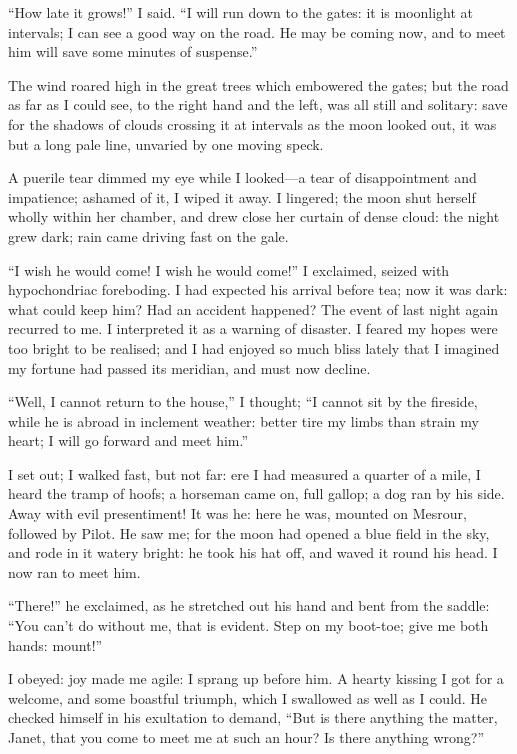 \enquote{How late it grows!} I said.  \enquote{I will run down to the
gates: it is moonlight at intervals; I can see a good way on the road. 
He may be coming now, and to meet him will save some minutes of
suspense.}

The wind roared high in the great trees which embowered the gates; but
the road as far as I could see, to the right hand and the left, was all
still and solitary: save for the shadows of clouds crossing it at
intervals as the moon looked out, it was but a long pale line, unvaried
by one moving speck.

A puerile tear dimmed my eye while I looked---a tear of disappointment
and impatience; ashamed of it, I wiped it away.  I lingered; the moon
shut herself wholly within her chamber, and drew close her curtain of
dense cloud: the night grew dark; rain came driving fast on the gale.

\enquote{I wish he would come!  I wish he would come!} I exclaimed,
seized with hypochondriac foreboding.  I had expected his arrival before
tea; now it was dark: what could keep him?  Had an accident happened? 
The event of last night again recurred to me.  I interpreted it as a
warning of disaster.  I feared my hopes were too bright to be realised;
and I had enjoyed so much bliss lately that I imagined my fortune had
passed its meridian, and must now decline.

\enquote{Well, I cannot return to the house,} I thought; \enquote{I
cannot sit by the fireside, while he is abroad in inclement weather:
better tire my limbs than strain my heart; I will go forward and meet
him.}

I set out; I walked fast, but not far: ere I had measured a quarter of a
mile, I heard the tramp of hoofs; a horseman came on, full gallop; a dog
ran by his side.  Away with evil presentiment!  It was he: here he was,
mounted on Mesrour, followed by Pilot.  He saw me; for the moon had
opened a blue field in the sky, and rode in it watery bright: he took
his hat off, and waved it round his head.  I now ran to meet him.

\enquote{There!} he exclaimed, as he stretched out his hand and bent
from the saddle: \enquote{You can't do without me, that is evident. 
Step on my boot-toe; give me both hands: mount!}

I obeyed: joy made me agile: I sprang up before him.  A hearty kissing I
got for a welcome, and some boastful triumph, which I swallowed as well
as I could.  He checked himself in his exultation to demand,
\enquote{But is there anything the matter, Janet, that you come to meet
me at such an hour?  Is there anything wrong?}

